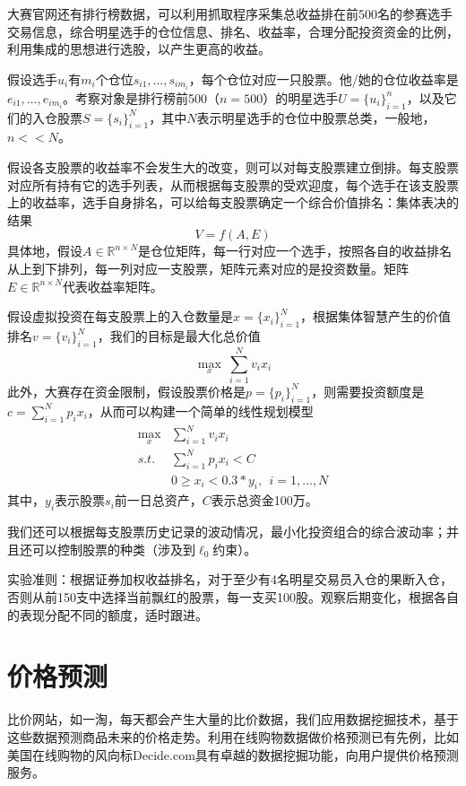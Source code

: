 大赛官网还有排行榜数据，可以利用抓取程序采集总收益排在前500名的参赛选手交易信息，综合明星选手的仓位信息、排名、收益率，合理分配投资资金的比例，利用集成的思想进行选股，以产生更高的收益。

假设选手$u_i$有$m_i$个仓位$s_{i1},\ldots,s_{im_i}$，每个仓位对应一只股票。他/她的仓位收益率是$e_{i1},\ldots,e_{im_i}$。考察对象是排行榜前500（$n=500$）的明星选手$U=\{u_i\}_{i=1}^n$，以及它们的入仓股票$S=\{s_i\}_{i=1}^N$，其中$N$表示明星选手的仓位中股票总类，一般地，$n<<N$。

假设各支股票的收益率不会发生大的改变，则可以对每支股票建立倒排。每支股票对应所有持有它的选手列表，从而根据每支股票的受欢迎度，每个选手在该支股票上的收益率，选手自身排名，可以给每支股票确定一个综合价值排名：集体表决的结果
\begin{equation}
    V = f(A, E)
\end{equation}
具体地，假设$A\in \mathbb{R}^{n\times N}$是仓位矩阵，每一行对应一个选手，按照各自的收益排名从上到下排列，每一列对应一支股票，矩阵元素对应的是投资数量。矩阵$E\in \mathbb{R}^{n\times N}$代表收益率矩阵。

假设虚拟投资在每支股票上的入仓数量是$x=\{x_i\}_{i=1}^N$，根据集体智慧产生的价值排名$v=\{v_i\}_{i=1}^N$，我们的目标是最大化总价值
\begin{equation}
    \max\limits_{x}~\sum\limits_{i=1}^N v_i x_i
\end{equation}
此外，大赛存在资金限制，假设股票价格是$p=\{p_i\}_{i=1}^N$，则需要投资额度是$c=\sum\limits_{i=1}^N p_i x_i$，从而可以构建一个简单的线性规划模型
\begin{equation}
    \begin{array}{ll}
      \max\limits_{x} & \sum\limits_{i=1}^N v_i x_i \\
      \textit{s.t.} & \sum\limits_{i=1}^N p_i x_i < C \\ 
      & 0 \ge x_i < 0.3 * y_i,~~i=1,\ldots,N
    \end{array}
\end{equation}
其中，$y_i$表示股票$s_i$前一日总资产，$C$表示总资金100万。

我们还可以根据每支股票历史记录的波动情况，最小化投资组合的综合波动率；并且还可以控制股票的种类（涉及到$\ell_0$约束）。

实验准则：根据证券加权收益排名，对于至少有4名明星交易员入仓的果断入仓，否则从前150支中选择当前飘红的股票，每一支买100股。观察后期变化，根据各自的表现分配不同的额度，适时跟进。

\section{价格预测}
比价网站，如一淘，每天都会产生大量的比价数据，我们应用数据挖掘技术，基于这些数据预测商品未来的价格走势。利用在线购物数据做价格预测已有先例，比如美国在线购物的风向标Decide.com具有卓越的数据挖掘功能，向用户提供价格预测服务。

